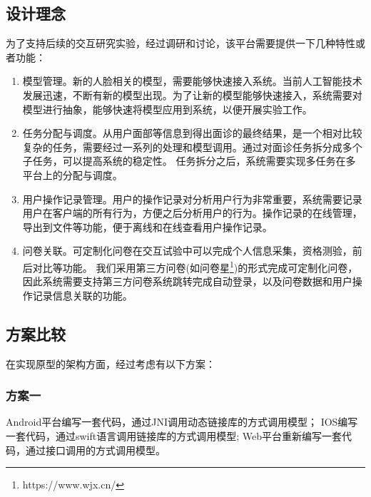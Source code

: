 
\subsection{设计理念}




为了支持后续的交互研究实验，经过调研和讨论，该平台需要提供一下几种特性或者功能：

\begin{enumerate}
    \item 模型管理。新的人脸相关的模型，需要能够快速接入系统。当前人工智能技术发展迅速，不断有新的模型出现。为了让新的模型能够快速接入，系统需要对模型进行抽象，能够快速将模型应用到系统，以便开展实验工作。

    \item 任务分配与调度。从用户面部等信息到得出面诊的最终结果，是一个相对比较复杂的任务，需要经过一系列的处理和模型调用。通过对面诊任务拆分成多个子任务，可以提高系统的稳定性。
任务拆分之后，系统需要实现多任务在多平台上的分配与调度。

    \item 用户操作记录管理。用户的操作记录对分析用户行为非常重要，系统需要记录用户在客户端的所有行为，方便之后分析用户的行为。操作记录的在线管理，导出到文件等功能，便于离线和在线查看用户操作记录。

    \item 问卷关联。可定制化问卷在交互试验中可以完成个人信息采集，资格测验，前后对比等功能。
我们采用第三方问卷(如问卷星\footnote{https://www.wjx.cn/})的形式完成可定制化问卷，因此系统需要支持第三方问卷系统跳转完成自动登录，以及问卷数据和用户操作记录信息关联的功能。
\end{enumerate}


\subsection{方案比较}
在实现原型的架构方面，经过考虑有以下方案：

\subsubsection{方案一}
Android平台编写一套代码，通过JNI调用动态链接库的方式调用模型； IOS编写一套代码，通过swift语言调用链接库的方式调用模型; Web平台重新编写一套代码，通过接口调用的方式调用模型。

